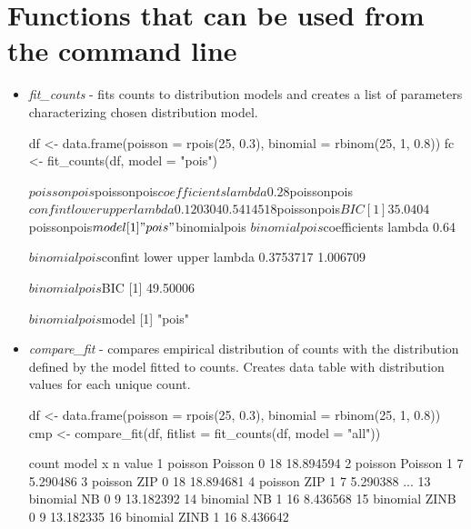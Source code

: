 \section{Functions that can be used from the command line}

\begin{itemize}
    \item \textit{fit\_counts} - fits counts to distribution models and creates a list of parameters characterizing chosen distribution model.

{\bfseries
\begin{example}
df <- data.frame(poisson = rpois(25, 0.3), binomial = rbinom(25, 1, 0.8))
fc <- fit_counts(df, model = "pois") 
\end{example}
}

\begin{example}
$poissonpois
$poissonpois$coefficients
lambda 
  0.28 

$poissonpois$confint
          lower     upper
lambda 0.120304 0.5414518

$poissonpois$BIC
[1] 35.0404

$poissonpois$model
[1] "pois"


$binomialpois
$binomialpois$coefficients
lambda 
  0.64 

$binomialpois$confint
           lower    upper
lambda 0.3753717 1.006709

$binomialpois$BIC
[1] 49.50006

$binomialpois$model
[1] "pois"
\end{example}


    \item \textit{compare\_fit} - compares empirical distribution of counts with the distribution defined by the model fitted to counts. Creates data table with distribution values for each unique count.


{\bfseries
\begin{example}
df <- data.frame(poisson = rpois(25, 0.3), binomial = rbinom(25, 1, 0.8))
cmp <- compare_fit(df, fitlist = fit_counts(df, model = "all"))
\end{example}
}

\begin{example}
      count   model x  n     value
1   poisson Poisson 0 18 18.894594
2   poisson Poisson 1  7  5.290486
3   poisson     ZIP 0 18 18.894681
4   poisson     ZIP 1  7  5.290388
...
13 binomial      NB 0  9 13.182392
14 binomial      NB 1 16  8.436568
15 binomial    ZINB 0  9 13.182335
16 binomial    ZINB 1 16  8.436642
\end{example}


\end{itemize}
